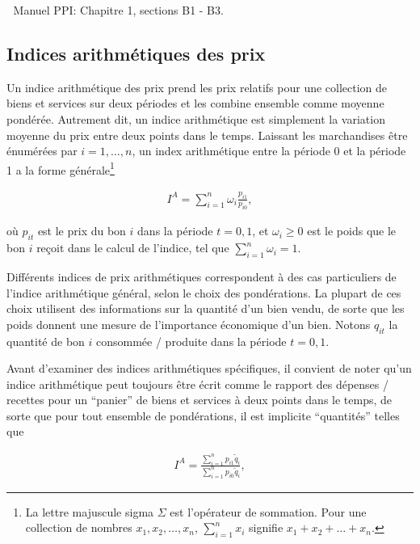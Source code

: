 \documentclass[]{article}
\begin{document}
📖 Manuel PPI: Chapitre 1, sections B1 - B3.

\hypertarget{indices-arithmuxe9tiques-des-prix}{%
\subsection{Indices arithmétiques des prix}\label{indices-arithmuxe9tiques-des-prix}}

Un indice arithmétique des prix prend les prix relatifs pour une collection de biens et services sur deux périodes et les combine ensemble comme moyenne pondérée. Autrement dit, un indice arithmétique est simplement la variation moyenne du prix entre deux points dans le temps. Laissant les marchandises être énumérées par \(i = 1, \ldots, n\), un index arithmétique entre la période 0 et la période 1 a la forme générale\footnote{La lettre majuscule sigma \(\Sigma\) est l'opérateur de sommation. Pour une collection de nombres \(x_{1}, x_{2}, \ldots, x_{n}\), \(\sum_{i = 1}^{n} x_{i}\) signifie \(x_{1} + x_{2} + \ldots + x_{n}\).}

\begin{align*}
I^{A} = \sum_{i = 1}^{n} \omega_{i} \frac{p_{i1}}{p_{i0}},
\end{align*}

où \(p_{it}\) est le prix du bon \(i\) dans la période \(t = 0,1\), et \(\omega_{i} \geq 0\) est le poids que le bon \(i\) reçoit dans le calcul de l'indice, tel que \(\sum_{i = 1}^{n} \omega_{i} = 1\).

Différents indices de prix arithmétiques correspondent à des cas particuliers de l'indice arithmétique général, selon le choix des pondérations. La plupart de ces choix utilisent des informations sur la quantité d'un bien vendu, de sorte que les poids donnent une mesure de l'importance économique d'un bien. Notons \(q_{it}\) la quantité de bon \(i\) consommée / produite dans la période \(t = 0,1\).

Avant d'examiner des indices arithmétiques spécifiques, il convient de noter qu'un indice arithmétique peut toujours être écrit comme le rapport des dépenses / recettes pour un ``panier'' de biens et services à deux points dans le temps, de sorte que pour tout ensemble de pondérations, il est implicite ``quantités'' telles que

\begin{align*}
I^{A} = \frac{\sum_{i = 1}^{n} p_{i1} \tilde{q}_{i}}{\sum_{i = 1}^{n} p_{i0} \tilde{q}_{i}},
\end{align*}
\end{document}
